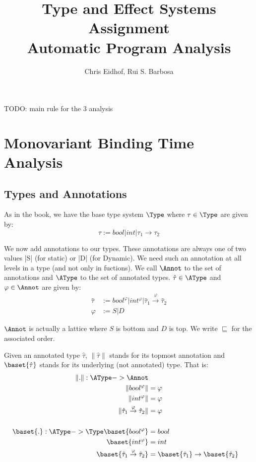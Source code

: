 \documentclass[a4wide,12pt]{article}
\theoremstyle{definition}
\theoremstyle{plain}
\theoremstyle{remark}
\def\sqleq{\sqsubseteq}
\def\htau{\hat{\tau}}
\def\annot#1{\|#1\|}
\begin{document}
\author{Chris Eidhof, Rui S. Barbosa}
\title{Type and Effect Systems Assignment \\ Automatic Program Analysis}
 
\maketitle

TODO: main rule for the 3 analysis

\section{Monovariant Binding Time Analysis}

\subsection{Types and Annotations}
As in the book, we have the base type system $\Type$ where $\tau \in \Type$ are given by:
\[\tau := bool | int | \tau_1 \to \tau_2\]

We  now add annotations to our types. These annotations are always
one of two values |S| (for static) or |D| (for Dynamic). 
We need such an annotation
at all levels in a type (and not only in fuctions). We call $\Annot$ to the set of annotations
and $\AType$ to the set of annotated types. $\htau \in \AType$ and $\varphi \in \Annot$ are given by:
\begin{eqnarray*}
\htau & := bool^\varphi | int^\varphi | \htau_1 \overset{\varphi}{\to} \htau_2 
\\
\varphi & := S | D
\end{eqnarray*}

$\Annot$ is actually a lattice where $S$ is bottom and  $D$ is top. We write $\sqleq$ for
the associated order. 

Given an annotated type $\htau$, $\annot{\htau}$ stands for its topmost annotation
and $\baset{\htau}$ stands for its underlying (not annotated) type. That is:
\begin{eqnarray*}
\annot{.} : \AType -> \Annot\\
\annot{bool^\varphi} & = \varphi \\
\annot{int^\varphi} & = \varphi \\
\annot{\htau_1 \overset{\varphi}{\to} \htau_2} & = \varphi \\
\\
\baset{.} : \AType -> \Type
\baset{bool^\varphi} & = bool \\
\baset{int^\varphi} & = int \\
\baset{\htau_1 \overset{\varphi}{\to} \htau_2} & = \baset{\htau_1} \to \baset{\htau_2} \\
\end{eqnarray*}
\end{document}
